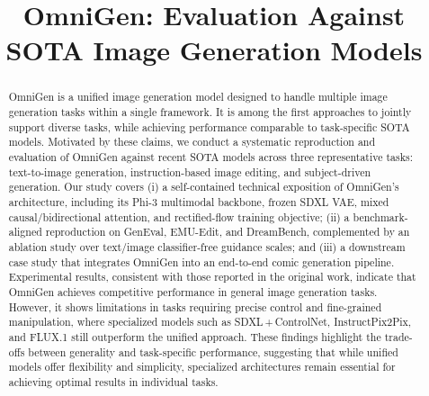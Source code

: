 \documentclass[conference]{IEEEtran}
\begin{document}
\title{OmniGen: Evaluation Against SOTA Image Generation Models}

\author{
\and
{}
}

\maketitle

\begin{abstract}
OmniGen is a unified image generation model designed to handle multiple image generation tasks within a single framework. It is among the first approaches to jointly support diverse tasks, while achieving performance comparable to task-specific SOTA models. Motivated by these claims, we conduct a systematic reproduction and evaluation of OmniGen against recent SOTA models across three representative tasks: text-to-image generation, instruction-based image editing, and subject-driven generation. Our study covers (i) a self-contained technical exposition of OmniGen's architecture, including its Phi-3 multimodal backbone, frozen SDXL VAE, mixed causal/bidirectional attention, and rectified-flow training objective; (ii) a benchmark-aligned reproduction on GenEval, EMU-Edit, and DreamBench, complemented by an ablation study over text/image classifier-free guidance scales; and (iii) a downstream case study that integrates OmniGen into an end-to-end comic generation pipeline. Experimental results, consistent with those reported in the original work, indicate that OmniGen achieves competitive performance in general image generation tasks. However, it shows limitations in tasks requiring precise control and fine-grained manipulation, where specialized models such as SDXL\,+\,ControlNet, InstructPix2Pix, and FLUX.1 still outperform the unified approach. These findings highlight the trade-offs between generality and task-specific performance, suggesting that while unified models offer flexibility and simplicity, specialized architectures remain essential for achieving optimal results in individual tasks.
\end{abstract}
\end{document}
